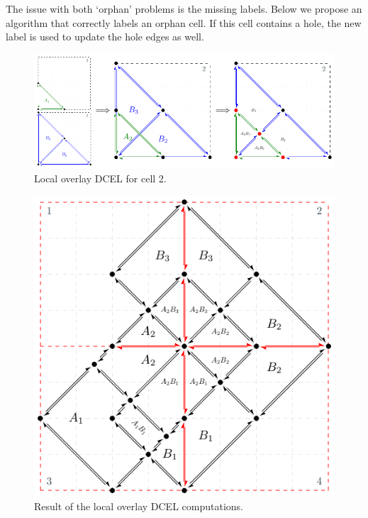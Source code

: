 The issue with both `orphan' problems is the missing labels. Below we propose an algorithm that correctly labels an orphan cell. If this cell contains a hole, the new label is used to update the hole edges as well. 

\begin{figure}
    \centering
    \includegraphics[width=0.9\linewidth]{figures/overlay_partition/overlay_partition.pdf}
    \caption{Local overlay DCEL for cell 2.}\label{fig:overlay_partition}
\end{figure}

\begin{figure}
    \centering
    \includegraphics[width=0.6\linewidth]{figures/distributed_dcel/distributed_dcel.pdf}    
    \caption{Result of the local overlay DCEL computations.}\label{fig:distributed_dcel}
\end{figure}


